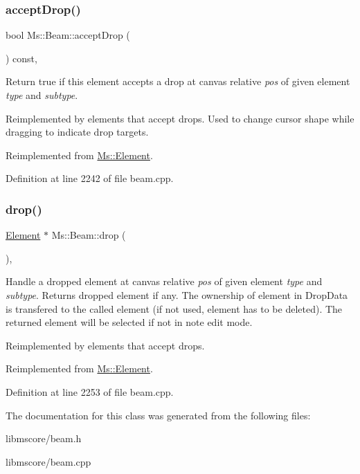 \subsubsection{\texorpdfstring{accept\+Drop()}{acceptDrop()}}
{\footnotesize\ttfamily bool Ms\+::\+Beam\+::accept\+Drop (\begin{DoxyParamCaption}\item[{\hyperlink{class_ms_1_1_edit_data}{Edit\+Data} \&}]{ }\end{DoxyParamCaption}) const\hspace{0.3cm}{\ttfamily [override]}, {\ttfamily [virtual]}}

Return true if this element accepts a drop at canvas relative {\itshape pos} of given element {\itshape type} and {\itshape subtype}.

Reimplemented by elements that accept drops. Used to change cursor shape while dragging to indicate drop targets. 

Reimplemented from \hyperlink{class_ms_1_1_element_a35614445f0bc2212cbcc75c3f5810543}{Ms\+::\+Element}.



Definition at line 2242 of file beam.\+cpp.

\mbox{\label{class_ms_1_1_beam_adea642fbb6e75bb9f004fe86968a8d03}} 
\subsubsection{\texorpdfstring{drop()}{drop()}}
{\footnotesize\ttfamily \hyperlink{class_ms_1_1_element}{Element} $\ast$ Ms\+::\+Beam\+::drop (\begin{DoxyParamCaption}\item[{\hyperlink{class_ms_1_1_edit_data}{Edit\+Data} \&}]{ }\end{DoxyParamCaption})\hspace{0.3cm}{\ttfamily [override]}, {\ttfamily [virtual]}}

Handle a dropped element at canvas relative {\itshape pos} of given element {\itshape type} and {\itshape subtype}. Returns dropped element if any. The ownership of element in Drop\+Data is transfered to the called element (if not used, element has to be deleted). The returned element will be selected if not in note edit mode.

Reimplemented by elements that accept drops. 

Reimplemented from \hyperlink{class_ms_1_1_element_a0ca69a9fb48e7b9fb481aacaf3860032}{Ms\+::\+Element}.



Definition at line 2253 of file beam.\+cpp.



The documentation for this class was generated from the following files\+:\begin{DoxyCompactItemize}
\item 
libmscore/beam.\+h\item 
libmscore/beam.\+cpp\end{DoxyCompactItemize}
